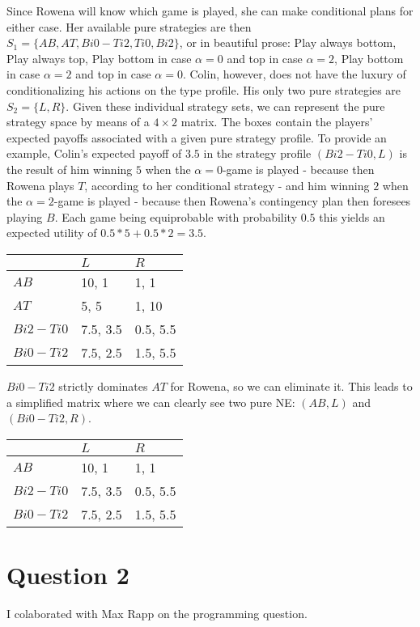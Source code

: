 \documentclass[10pt,a4paper]{article}
\begin{document}
Since Rowena will know which game is played, she can make conditional plans for either case. Her available pure strategies are then $S_1=\{AB,AT,Bi0-Ti2,Ti0,Bi2\}$, or in beautiful prose: Play always bottom, Play always top, Play bottom in case $\alpha=0$ and top in case $\alpha=2$, Play bottom in case $\alpha=2$ and top in case $\alpha=0$. Colin, however, does not have the luxury of conditionalizing his actions on the type profile. His only two pure strategies are $S_2=\{L,R\}$. Given these individual strategy sets, we can represent the pure strategy space by means of a $4\times 2$ matrix. The boxes contain the players' expected payoffs associated with a given pure strategy profile. To provide an example, Colin's expected payoff of $3.5$ in the strategy profile $(Bi2-Ti0,L)$ is the result of him winning $5$ when the $\alpha=0$-game is played - because then Rowena plays $T$, according to her conditional strategy - and him winning $2$ when the $\alpha=2$-game is played - because then Rowena's contingency plan then foresees playing $B$. Each game being equiprobable with probability $0.5$ this yields an expected utility of $0.5*5+0.5*2=3.5$.
\begin{table}[h]
\centering
\begin{tabular}[l]{|l|l|l|}
\hline
          & $L$ & $R$  \\ \hline
$AB$     & 10, 1   & 1, 1 \\ \hline
$AT$		& 5, 5	& 1, 10 \\ \hline
$Bi2-Ti0$	& 7.5, 3.5 & 0.5, 5.5 \\ \hline
$Bi0-Ti2$	& 7.5, 2.5	& 1.5, 5.5 \\ \hline
\end{tabular}
\end{table}

$Bi0-Ti2$ strictly dominates $AT$ for Rowena, so we can eliminate it. This leads to a simplified matrix where we can clearly see two pure NE: $(AB,L)$ and $(Bi0-Ti2,R)$.
\begin{table}[h]
\centering
\begin{tabular}[l]{|l|l|l|}
\hline
          & $L$ & $R$  \\ \hline
$AB$     & 10, 1   & 1, 1 \\ \hline
$Bi2-Ti0$	& 7.5, 3.5 & 0.5, 5.5 \\ \hline
$Bi0-Ti2$	& 7.5, 2.5	& 1.5, 5.5 \\ \hline
\end{tabular}
\end{table}
\section*{Question 2}
I colaborated with Max Rapp on the programming question.
\end{document}

